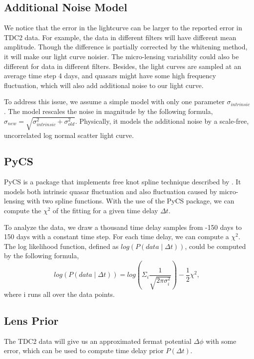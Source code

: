 \documentclass[\docopts]{\docclass}
\begin{document}
\subsection{Additional Noise Model}
We notice that the error in the lightcurve can be larger to the reported error in TDC2 data. For example, the data in different filters will have different mean amplitude. Though the difference is partially corrected by the whitening method, it will make our light curve noisier. The micro-lensing variability could also be different for data in different filters. Besides, the light curves are sampled at an average time step 4 days, and quasars might have some high frequency fluctuation, which will also add additional noise to our light curve. 

To address this issue, we assume a simple model with only one parameter $\sigma_{intrinsic}$. The model rescales the noise in magnitude by the following formula, $\sigma_{new}=\sqrt{\sigma_{intrinsic}^2+\sigma_{old}^2}$.  Physically, it models the additional noise by a scale-free, uncorrelated log normal scatter light curve. 

\subsection{PyCS}
PyCS is a package that implements free knot spline technique described by \cite{2013A&A...553A.120T}. It models both intrinsic quasar fluctuation and also fluctuation caused by micro-lensing with two spline functions. With the use of the PyCS package, we can compute the $\chi^2$ of the fitting for a given time delay $\Delta t$. 

To analyze the data, we draw  a thousand time delay samples from -150 days to 150 days with a constant time step. For each time delay, we can compute a $\chi^2$. The log likelihood function, defined as $log(P(data \mid \Delta t))$, could be computed by the following formula,
\begin{equation}
log(P(data \mid \Delta t))  = log (\Sigma_i  \frac{1}{\sqrt{2 \pi \sigma_i^2}} ) -\frac{1}{2} \chi^2,
\end{equation}
where i runs all over the data points. 

\subsection{Lens Prior}
The TDC2 data will give us an approximated fermat potential $\Delta \phi$ with some error, which can be used to compute time delay prior $P(\Delta t)$.
\end{document}
